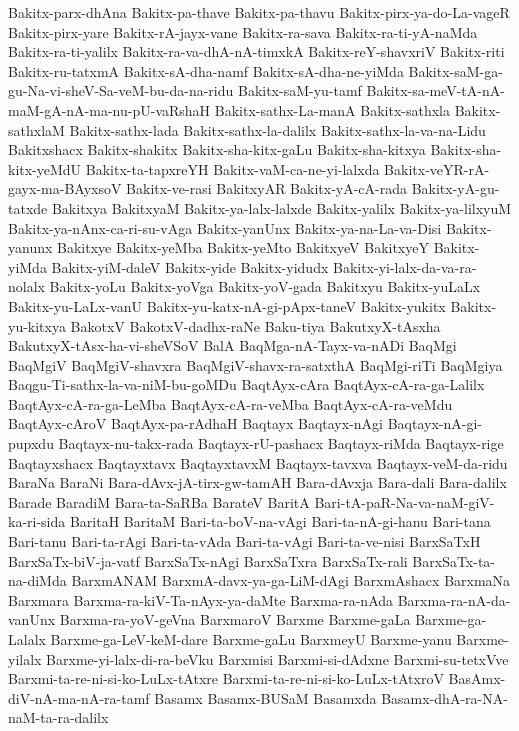 {Bakitx-parx-dhAna
Bakitx-pa-thave
Bakitx-pa-thavu
Bakitx-pirx-ya-do-La-vageR
Bakitx-pirx-yare
Bakitx-rA-jayx-vane
Bakitx-ra-sava
Bakitx-ra-ti-yA-naMda
Bakitx-ra-ti-yalilx
Bakitx-ra-va-dhA-nA-timxkA
Bakitx-reY-shavxriV
Bakitx-riti
Bakitx-ru-tatxmA
Bakitx-sA-dha-namf
Bakitx-sA-dha-ne-yiMda
Bakitx-saM-ga-gu-Na-vi-sheV-Sa-veM-bu-da-na-ridu
Bakitx-saM-yu-tamf
Bakitx-sa-meV-tA-nA-maM-gA-nA-ma-nu-pU-vaRshaH
Bakitx-sathx-La-manA
Bakitx-sathxla
Bakitx-sathxlaM
Bakitx-sathx-lada
Bakitx-sathx-la-dalilx
Bakitx-sathx-la-va-na-Lidu
Bakitxshacx
Bakitx-shakitx
Bakitx-sha-kitx-gaLu
Bakitx-sha-kitxya
Bakitx-sha-kitx-yeMdU
Bakitx-ta-tapxreYH
Bakitx-vaM-ca-ne-yi-lalxda
Bakitx-veYR-rA-gayx-ma-BAyxsoV
Bakitx-ve-rasi
BakitxyAR
Bakitx-yA-cA-rada
Bakitx-yA-gu-tatxde
Bakitxya
BakitxyaM
Bakitx-ya-lalx-lalxde
Bakitx-yalilx
Bakitx-ya-lilxyuM
Bakitx-ya-nAnx-ca-ri-su-vAga
Bakitx-yanUnx
Bakitx-ya-na-La-va-Disi
Bakitx-yanunx
Bakitxye
Bakitx-yeMba
Bakitx-yeMto
BakitxyeV
BakitxyeY
Bakitx-yiMda
Bakitx-yiM-daleV
Bakitx-yide
Bakitx-yidudx
Bakitx-yi-lalx-da-va-ra-nolalx
Bakitx-yoLu
Bakitx-yoVga
Bakitx-yoV-gada
Bakitxyu
Bakitx-yuLaLx
Bakitx-yu-LaLx-vanU
Bakitx-yu-katx-nA-gi-pApx-taneV
Bakitx-yukitx
Bakitx-yu-kitxya
BakotxV
BakotxV-dadhx-raNe
Baku-tiya
BakutxyX-tAsxha
BakutxyX-tAsx-ha-vi-sheVSoV
BalA
BaqMga-nA-Tayx-va-nADi
BaqMgi
BaqMgiV
BaqMgiV-shavxra
BaqMgiV-shavx-ra-satxthA
BaqMgi-riTi
BaqMgiya
Baqgu-Ti-sathx-la-va-niM-bu-goMDu
BaqtAyx-cAra
BaqtAyx-cA-ra-ga-Lalilx
BaqtAyx-cA-ra-ga-LeMba
BaqtAyx-cA-ra-veMba
BaqtAyx-cA-ra-veMdu
BaqtAyx-cAroV
BaqtAyx-pa-rAdhaH
Baqtayx
Baqtayx-nAgi
Baqtayx-nA-gi-pupxdu
Baqtayx-nu-takx-rada
Baqtayx-rU-pashacx
Baqtayx-riMda
Baqtayx-rige
Baqtayxshacx
Baqtayxtavx
BaqtayxtavxM
Baqtayx-tavxva
Baqtayx-veM-da-ridu
BaraNa
BaraNi
Bara-dAvx-jA-tirx-gw-tamAH
Bara-dAvxja
Bara-dali
Bara-dalilx
Barade
BaradiM
Bara-ta-SaRBa
BarateV
BaritA
Bari-tA-paR-Na-va-naM-giV-ka-ri-sida
BaritaH
BaritaM
Bari-ta-boV-na-vAgi
Bari-ta-nA-gi-hanu
Bari-tana
Bari-tanu
Bari-ta-rAgi
Bari-ta-vAda
Bari-ta-vAgi
Bari-ta-ve-nisi
BarxSaTxH
BarxSaTx-biV-ja-vatf
BarxSaTx-nAgi
BarxSaTxra
BarxSaTx-rali
BarxSaTx-ta-na-diMda
BarxmANAM
BarxmA-davx-ya-ga-LiM-dAgi
BarxmAshacx
BarxmaNa
Barxmara
Barxma-ra-kiV-Ta-nAyx-ya-daMte
Barxma-ra-nAda
Barxma-ra-nA-da-vanUnx
Barxma-ra-yoV-geVna
BarxmaroV
Barxme
Barxme-gaLa
Barxme-ga-Lalalx
Barxme-ga-LeV-keM-dare
Barxme-gaLu
BarxmeyU
Barxme-yanu
Barxme-yilalx
Barxme-yi-lalx-di-ra-beVku
Barxmisi
Barxmi-si-dAdxne
Barxmi-su-tetxVve
Barxmi-ta-re-ni-si-ko-LuLx-tAtxre
Barxmi-ta-re-ni-si-ko-LuLx-tAtxroV
BasAmx-diV-nA-ma-nA-ra-tamf
Basamx
Basamx-BUSaM
Basamxda
Basamx-dhA-ra-NA-naM-ta-ra-dalilx
}
